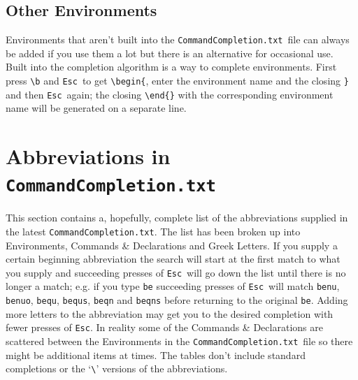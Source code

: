 \documentclass[11pt]{article}
\newcommand{\esckey}{\texttt{Esc}}
\newcommand{\CCT}{\texttt{CommandCompletion.txt}}
\begin{document}
\subsection*{Other Environments}

Environments that aren't built into the \CCT\ file can always be added if you use them a lot but there is an alternative for occasional use. Built into the completion algorithm is a way to complete environments. First press \verb|\b| and \esckey\ to get \verb|\begin{|, enter the environment name and the closing \texttt{\}} and then \esckey\ again; the closing \verb|\end{}| with the corresponding environment name will be generated on a separate line.

\section*{Abbreviations in \CCT}

This section contains a, hopefully, complete list of the abbreviations supplied in the latest \CCT. The list has been broken up into Environments, Commands \& Declarations and Greek Letters. If you supply a certain beginning abbreviation the search will start at the first match to what you supply and succeeding presses of \esckey\ will go down the list until there is no longer a match; e.g. if you type \texttt{be} succeeding presses of \esckey\ will match \texttt{benu}, \texttt{benuo}, \texttt{bequ}, \texttt{bequs}, \texttt{beqn} and \texttt{beqns} before returning to the original \texttt{be}. Adding more letters to the abbreviation may get you to the desired completion with fewer presses of \esckey. In reality some of the Commands \& Declarations are scattered between the Environments in the \CCT\ file so there might be additional items at times. The tables don't include standard completions or the `\verb"\"' versions of the abbreviations.
\end{document}
